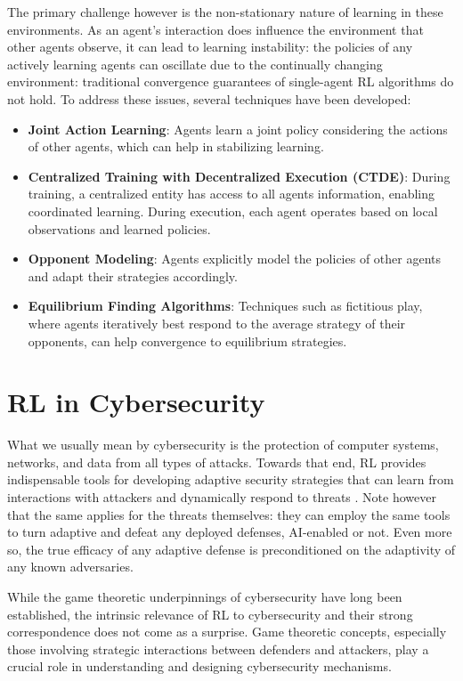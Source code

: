 The primary challenge however is the non-stationary nature of learning in these environments.
As an agent's interaction does influence the environment that other agents observe, it can lead to learning instability: the policies of any actively learning agents can oscillate due to the continually changing environment: traditional convergence guarantees of single-agent \gls{RL} algorithms do not hold.
To address these issues, several techniques have been developed:

\begin{itemize}
    \item \textbf{Joint Action Learning}: Agents learn a joint policy considering the actions of other agents, which can help in stabilizing learning.
    \item \textbf{Centralized Training with Decentralized Execution (CTDE)}: During training, a centralized entity has access to all agents information, enabling coordinated learning. During execution, each agent operates based on local observations and learned policies.
    \item \textbf{Opponent Modeling}: Agents explicitly model the policies of other agents and adapt their strategies accordingly.
    \item \textbf{Equilibrium Finding Algorithms}: Techniques such as fictitious play, where agents iteratively best respond to the average strategy of their opponents, can help convergence to equilibrium strategies.
\end{itemize}

\section{\gls{RL} in Cybersecurity}

What we usually mean by cybersecurity is the protection of computer systems, networks, and data from all types of attacks.
Towards that end, \gls{RL} provides indispensable tools for developing adaptive security strategies that can learn from interactions with attackers and dynamically respond to threats \cite{nguyen2021deep}.
Note however that the same applies for the threats themselves: they can employ the same tools to turn adaptive and defeat any deployed defenses, AI-enabled or not.
Even more so, the true efficacy of any adaptive defense is preconditioned on the adaptivity of any known adversaries.

While the game theoretic underpinnings of cybersecurity have long been established, the intrinsic relevance of \gls{RL} to cybersecurity and their strong correspondence does not come as a surprise.
Game theoretic concepts, especially those involving strategic interactions between defenders and attackers, play a crucial role in understanding and designing cybersecurity mechanisms.


